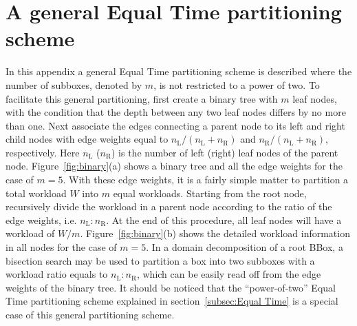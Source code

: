 \commentoutA{\documentclass[prl,aps,twocolumn,showpacs,twocolumngrid,superbib]{revtex4}}
\begin{document}
\clearpage
\appendix
{}
\section{A general Equal Time partitioning scheme}
\label{appex:GET}
In this appendix a general Equal Time partitioning scheme is described where 
the number of subboxes, denoted by $m$, is not restricted to a power of two.
To facilitate this general 
partitioning, first create a binary tree with $m$ leaf nodes, with
the condition that the depth between any two leaf nodes differs by no more
than one. 
Next associate the edges connecting a parent node to its left and 
right child nodes with edge weights equal to 
$n_{\scriptscriptstyle\mathrm{L}}/(n_{\scriptscriptstyle\mathrm{L}}+n_{\scriptscriptstyle\mathrm{R}})$
and $n_{\scriptscriptstyle\mathrm{R}}/(n_{\scriptscriptstyle\mathrm{L}}+n_{\scriptscriptstyle\mathrm{R}})$, respectively. 
Here $n_{\scriptscriptstyle\mathrm{L}}$ ($n_{\scriptscriptstyle\mathrm{R}}$)
is the number of left (right) leaf nodes of the parent node. 
Figure~\ref{fig:binary}(a) shows a binary tree and all the edge weights 
for the case of $m=5$.
With these edge weights, it is a fairly simple matter 
to partition a total workload $W$ into $m$ equal workloads. Starting
from the root node,
recursively divide the workload in a parent node
according to the ratio of the edge weights, 
i.e. $n_{\scriptscriptstyle\mathrm{L}} : n_{\scriptscriptstyle\mathrm{R}} $. 
At the end of this procedure, all
leaf nodes will have a workload of $W/m$. Figure~\ref{fig:binary}(b) shows the 
detailed workload information in all nodes for the case of $m=5$. In a domain
decomposition of a root BBox, a bisection search may be used to partition
a box into two subboxes with a workload ratio equals to 
$n_{\scriptscriptstyle\mathrm{L}} : n_{\scriptscriptstyle\mathrm{R}}$,
which can be easily read off from the edge weights of the binary tree.
It should be noticed that the ``power-of-two'' Equal Time partitioning scheme 
explained in section~\ref{subsec:Equal Time} is a special 
case of this general partitioning scheme. 
\end{document}
